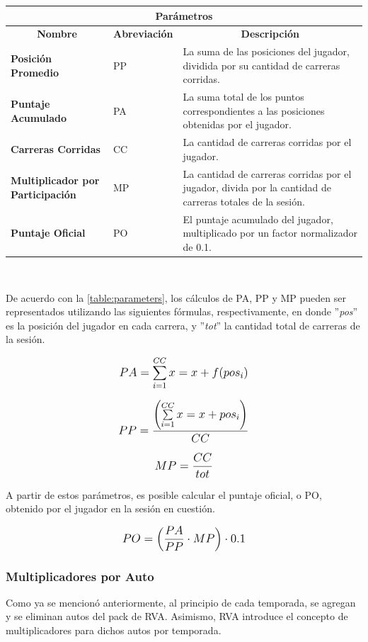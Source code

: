 \begin{center}
	\begin{tabular}{ | p{5cm} | l | p{7cm} |}
		\hline
		\multicolumn{3}{|c|}{\textbf{Parámetros}} \\
		\hline
		\multicolumn{1}{|c|}{\textbf{Nombre}} & \multicolumn{1}{|c|}{\textbf{Abreviación}} & \multicolumn{1}{|c|}{\textbf{Descripción}} \\
		\hline
		{\textbf{Posición Promedio}} & PP & La suma de las posiciones del jugador, dividida por su cantidad de carreras corridas. \\ \hline
		{\textbf{Puntaje Acumulado}} & PA & La suma total de los puntos correspondientes a las posiciones obtenidas por el jugador. \\ \hline
		{\textbf{Carreras Corridas}} & CC & La cantidad de carreras corridas por el jugador. \\ \hline
		{\textbf{Multiplicador por Participación}} & MP & La cantidad de carreras corridas por el jugador, divida por la cantidad de carreras totales de la sesión. \\ \hline
		{\textbf{Puntaje Oficial}} & PO & El puntaje acumulado del jugador, multiplicado por un factor normalizador de 0.1. \\ \hline
	\end{tabular}
  \\
  \label{table:parameters}
\end{center}

De acuerdo con la \autoref{table:parameters}, los cálculos de PA, PP y MP pueden ser representados utilizando las siguientes fórmulas, respectivamente, en donde ''\textit{pos}'' es la posición del jugador en cada carrera, y ''\textit{tot}'' la cantidad total de carreras de la sesión.

\[
\mathlarger{{PA} = \sum_{i=1}^{CC}x=x+f(pos_i)}
\]

\[
\mathlarger{{PP} = \frac{\left(\sum\limits_{i=1}^{CC}x=x+pos_i\right)}{CC}}
\]

\[
\mathlarger{{MP} = \frac{CC}{tot}}
\]

A partir de estos parámetros, es posible calcular el puntaje oficial, o PO, obtenido por el jugador en la sesión en cuestión.

\[
\mathlarger{{PO} = \left(\frac{PA}{PP} \cdot MP\right) \cdot 0.1}
\]

\subsubsection{Multiplicadores por Auto}
Como ya se mencionó anteriormente, al principio de cada temporada, se agregan y se eliminan autos del pack de RVA. Asimismo, RVA introduce el concepto de multiplicadores para dichos autos por temporada.

